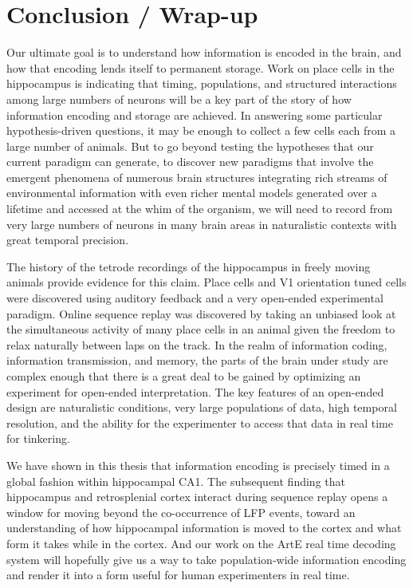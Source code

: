 \documentclass[]{article}
\let\stdsection\section
\renewcommand\section{\newpage\stdsection}
\begin{document}
\section{Conclusion / Wrap-up}

Our ultimate goal is to understand how information is encoded in the
brain, and how that encoding lends itself to permanent storage. Work on
place cells in the hippocampus is indicating that timing, populations,
and structured interactions among large numbers of neurons will be a key
part of the story of how information encoding and storage are achieved.
In answering some particular hypothesis-driven questions, it may be
enough to collect a few cells each from a large number of animals. But
to go beyond testing the hypotheses that our current paradigm can
generate, to discover new paradigms that involve the emergent phenomena
of numerous brain structures integrating rich streams of environmental
information with even richer mental models generated over a lifetime and
accessed at the whim of the organism, we will need to record from very
large numbers of neurons in many brain areas in naturalistic contexts
with great temporal precision.

The history of the tetrode recordings of the hippocampus in freely
moving animals provide evidence for this claim. Place cells and V1
orientation tuned cells were discovered using auditory feedback and a
very open-ended experimental paradigm. Online sequence replay was
discovered by taking an unbiased look at the simultaneous activity of
many place cells in an animal given the freedom to relax naturally
between laps on the track. In the realm of information coding,
information transmission, and memory, the parts of the brain under study
are complex enough that there is a great deal to be gained by optimizing
an experiment for open-ended interpretation. The key features of an
open-ended design are naturalistic conditions, very large populations of
data, high temporal resolution, and the ability for the experimenter to
access that data in real time for tinkering.

We have shown in this thesis that information encoding is precisely
timed in a global fashion within hippocampal CA1. The subsequent finding
that hippocampus and retrosplenial cortex interact during sequence
replay opens a window for moving beyond the co-occurrence of LFP events,
toward an understanding of how hippocampal information is moved to the
cortex and what form it takes while in the cortex. And our work on the
ArtE real time decoding system will hopefully give us a way to take
population-wide information encoding and render it into a form useful
for human experimenters in real time.
\end{document}
